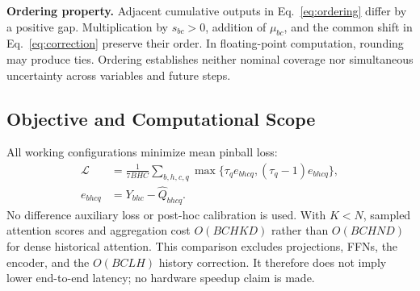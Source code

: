\noindent\textbf{Ordering property.}
Adjacent cumulative outputs in Eq.~\eqref{eq:ordering} differ by a positive gap. Multiplication by $s_{bc}>0$, addition of $\mu_{bc}$, and the common shift in Eq.~\eqref{eq:correction} preserve their order. In floating-point computation, rounding may produce ties. Ordering establishes neither nominal coverage nor simultaneous uncertainty across variables and future steps.

\subsection{Objective and Computational Scope}
All working configurations minimize mean pinball loss:
\begin{equation}
 \begin{aligned}
 \mathcal L&=\frac{1}{7BHC}\sum_{b,h,c,q}
 \max\{\tau_q e_{bhcq},(\tau_q-1)e_{bhcq}\},\\
 e_{bhcq}&=Y_{bhc}-\widehat Q_{bhcq}.
 \end{aligned}
\end{equation}
No difference auxiliary loss or post-hoc calibration is used. With $K<N$, sampled attention scores and aggregation cost $O(BCHKD)$ rather than $O(BCHND)$ for dense historical attention. This comparison excludes projections, FFNs, the encoder, and the $O(BCLH)$ history correction. It therefore does not imply lower end-to-end latency; no hardware speedup claim is made.
